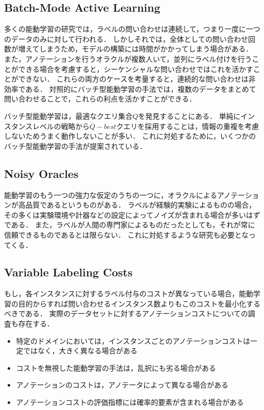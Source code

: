 \documentclass[11pt]{report}
\begin{document}
\subsection{Batch-Mode Active Learning}
多くの能動学習の研究では，ラベルの問い合わせは連続して，つまり一度に一つのデータのみに対して行われる．
しかしそれでは，全体としての問い合わせ回数が増えてしまうため，モデルの構築には時間がかかってしまう場合がある．
また，アノテーションを行うオラクルが複数人いて，並列にラベル付けを行うことができる場合を考慮すると，シーケンシャルな問い合わせではこれを活かすことができない．
これらの両方のケースを考量すると，連続的な問い合わせは非効率である．
対照的にバッチ型能動学習の手法では，複数のデータをまとめて問い合わせることで，これらの利点を活かすことができる．

バッチ型能動学習は，最適なクエリ集合$Q$を発見することにある．
単純にインスタンスレベルの戦略から$Q-best$クエリを採用することは，情報の重複を考慮しないためうまく動作しないことが多い．
これに対処するために，いくつかのバッチ型能動学習の手法が提案されている\cite{brinker2003incorporating}\cite{guo2008discriminative}\cite{hoi2006batch}．

\subsection{Noisy Oracles}
能動学習のもう一つの強力な仮定のうちの一つに，オラクルによるアノテーションが高品質であるというものがある．
ラベルが経験的実験によるものの場合，その多くは実験環境や計器などの設定によってノイズが含まれる場合が多いはずである．
また，ラベルが人間の専門家によるものだったとしても，それが常に信頼できるものであるとは限らない．
これに対処するような研究も必要となってくる．

\subsection{Variable Labeling Costs}
もし，各インスタンスに対するラベル付与のコストが異なっている場合，能動学習の目的からすれば問い合わせるインスタンス数よりもこのコストを最小化するべきである．
実際のデータセットに対するアノテーションコストについての調査も存在する\cite{settles2008active}．

\begin{itemize}
\item 特定のドメインにおいては，インスタンスごとのアノテーションコストは一定ではなく，大きく異なる場合がある
\item コストを無視した能動学習の手法は，乱択にも劣る場合がある
\item アノテーションのコストは，アノテータによって異なる場合がある
\item アノテーションコストの評価指標には確率的要素が含まれる場合がある
\end{itemize}
\end{document}
